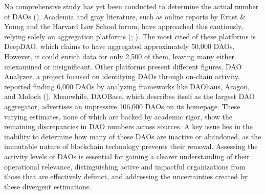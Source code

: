 No comprehensive study has yet been conducted to determine the actual number of DAOs (\cite{tan2023open}).
Academia and gray literature, such as online reports by Ernst \& Young and the Harvard Law School forum, have approached this cautiously, relying solely on aggregation platforms (\cite{ey2023legalComplexity}; \cite{gail2022aprimerondaos}).
The most cited of these platforms is DeepDAO, which claims to have aggregated approximately 50,000 DAOs.
However, it could enrich data for only 2,500 of them, leaving many either unexamined or insignificant.
Other platforms present different figures. DAO Analyzer, a project focused on identifying DAOs through on-chain activity, reported finding 6,000 DAOs by analyzing frameworks like DAOhaus, Aragon, and Moloch (\cite{arroyo2022dao}).
Meanwhile, DAOBase, which describes itself as the largest DAO aggregator, advertises an impressive 106,000 DAOs on its homepage.
These varying estimates, none of which are backed by academic rigor, show the remaining discrepancies in DAO numbers across sources.
A key issue lies in the inability to determine how many of these DAOs are inactive or abandoned, as the immutable nature of blockchain technology prevents their removal. Assessing the activity levels of DAOs is essential for gaining a clearer understanding of their operational relevance, distinguishing active and impactful organizations from those that are effectively defunct, and addressing the uncertainties created by these divergent estimations.

